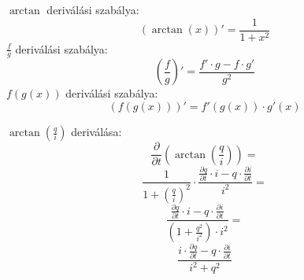 \documentclass[12pt,a4paper]{article}
\begin{document}
$\arctan$ deriválási szabálya:
\begin{equation}
\left( \arctan \left( x \right) \right)' = \frac{1}{1 + x^2}
\end{equation}
$\frac{f}{g}$ deriválási szabálya:
\begin{equation}
\left( \frac{f}{g} \right)' = \frac{ f' \cdot g - f  \cdot  g'}{g^2}
\end{equation}
$f(g(x))$ deriválási szabálya:
\begin{equation}
\left( f(g(x)) \right)' = f'(g(x)) \cdot g'(x)
\end{equation}
\vspace{20pt}

$\arctan \left( \frac{q}{i} \right)$ deriválása:
\begin{equation}
\frac{\partial}{\partial t}\left( \arctan \left( \frac{q}{i} \right) \right) = 
\end{equation}
\begin{equation}
\frac{1}{1 + \left( \frac{q}{i} \right)^2} \cdot \frac{\frac{\partial q}{\partial t} \cdot i - q  \cdot \frac{\partial i}{\partial t}}{i^2} =
\end{equation}
\begin{equation}
\frac{\frac{\partial q}{\partial t} \cdot i - q  \cdot \frac{\partial i}{\partial t}}{\left( 1 + \frac{q^2}{i^2} \right) \cdot i^2 } 
=
\end{equation}
\begin{equation}
\frac{i \cdot \frac{\partial q}{\partial t} - q \cdot \frac{\partial i}{\partial t}}{i^2 + q^2}
\end{equation}
\end{document}
